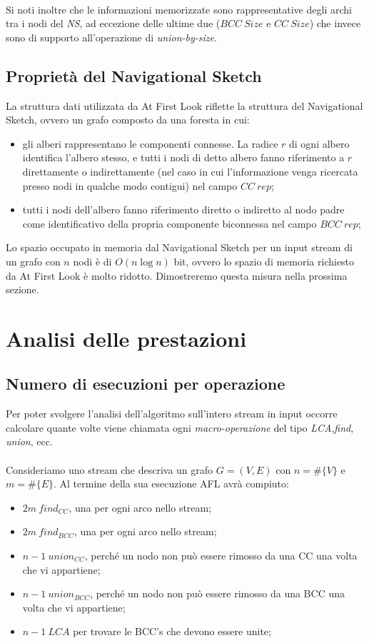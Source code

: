 \documentclass[a4paper,11pt]{report}
\begin{document}
\paragraph{}Si noti inoltre che le informazioni memorizzate sono rappresentative degli archi tra i nodi del \emph{NS}, ad eccezione delle
ultime due ($BCC\ Size$ e $CC\ Size$)
che invece sono di supporto all'operazione di \emph{union-by-size}. 

\subsection{Proprietà del Navigational Sketch}
La struttura dati utilizzata da At First Look riflette la struttura del Navigational Sketch, ovvero un grafo composto da una foresta in cui:
\begin{itemize}
 \item gli alberi rappresentano le componenti connesse. La radice $r$ di ogni albero identifica l'albero stesso, e tutti i nodi di detto
albero fanno riferimento
a $r$ direttamente o indirettamente (nel caso in cui l'informazione venga ricercata presso nodi in qualche modo contigui) nel campo $CC\
rep$;
 \item tutti i nodi dell'albero fanno riferimento diretto o indiretto al nodo padre come identificativo della propria componente biconnessa
nel campo $BCC\ rep$;
\end{itemize}
Lo spazio occupato in memoria dal Navigational Sketch per un input stream di un grafo con $n$ nodi è di $O(n\log n)$ bit, ovvero lo spazio
di memoria richiesto da At First Look è molto ridotto.
Dimostreremo questa misura nella prossima sezione.

\section{Analisi delle prestazioni}
\subsection{Numero di esecuzioni per operazione}
Per poter svolgere l'analisi dell'algoritmo sull'intero stream in input occorre calcolare quante volte viene chiamata ogni
\emph{macro-operazione} del tipo
\emph{LCA},\emph{find}, \emph{union}, ecc.
\paragraph{}
Consideriamo uno stream che descriva un grafo $G=(V,E)$ con $n=\#\{V\}$ e $m=\#\{E\}$. Al termine della sua esecuzione AFL avrà compiuto:
\begin{itemize}
 \item $2m\ find_{CC}$, una per ogni arco nello stream;
 \item $2m\ find_{BCC}$, una per ogni arco nello stream;
 \item $n-1\ union_{CC} $, perché un nodo non può essere rimosso da una CC una volta che vi appartiene;
 \item $n-1\ union_{BCC}$, perché un nodo non può essere rimosso da una BCC una volta che vi appartiene;
 \item $n-1\ LCA $ per trovare le BCC's che devono essere unite; 
\end{itemize}
\end{document}
